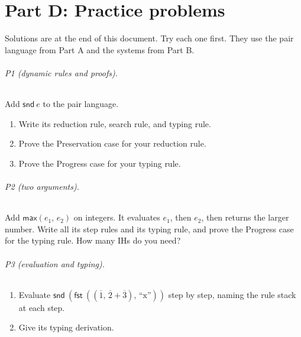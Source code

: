 \documentclass[11pt]{article}
\newcommand{\PAIR}[2]{(#1,\, #2)}
\newcommand{\FST}[1]{\mathsf{fst}\ #1}
\newcommand{\num}[1]{\overline{#1}}
\newcommand{\str}[1]{\text{``#1''}}
\newcommand{\SND}[1]{\mathsf{snd}\ #1}
\newcommand{\MAX}[2]{\mathsf{max}(#1,\, #2)}
\begin{document}
\newpage
\part*{Part D: Practice problems}

Solutions are at the end of this document. Try each one first. They use the
pair language from Part A and the systems from Part B.

\paragraph{P1 (dynamic rules and proofs).} Add $\SND{e}$ to the pair
language.
\begin{enumerate}
  \item Write its reduction rule, search rule, and typing rule.
  \item Prove the Preservation case for your reduction rule.
  \item Prove the Progress case for your typing rule.
\end{enumerate}

\paragraph{P2 (two arguments).} Add $\MAX{e_1}{e_2}$ on integers. It
evaluates $e_1$, then $e_2$, then returns the larger number. Write all its
step rules and its typing rule, and prove the Progress case for the typing
rule. How many IHs do you need?

\paragraph{P3 (evaluation and typing).}
\begin{enumerate}
  \item Evaluate $\SND{(\FST{\PAIR{\PAIR{\num1}{\num2+\num3}}{\str{x}}})}$
        step by step, naming the rule stack at each step.
  \item Give its typing derivation.
\end{enumerate}
\end{document}
